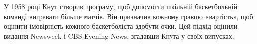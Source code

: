 \documentclass{article}
\begin{document}
У 1958 році Кнут створив програму, щоб допомогти шкільній баскетбольній команді вигравати більше матчів. Він призначив кожному гравцю «вартість», щоб оцінити імовірність кожного баскетболіста здобути очки. Цей підхід оцінили видання Newsweek і CBS Evening News, згадавши Кнута у своїх випусках.
	
	
\end{document}
